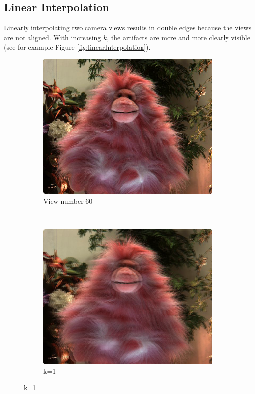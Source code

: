 \documentclass[a4paper]{article}
\begin{document}
\subsection*{Linear Interpolation}
Linearly interpolating two camera views results in double edges because the views are not aligned. With increasing $k$, the artifacts are more and more clearly visible (see for example Figure \ref{fig:linearInterpolation}). 
\begin{figure}[ht]
	\begin{subfigure}[h]{0.48\textwidth}
	  \includegraphics[width=\textwidth]{view60}
	  \caption*{View number 60}
	\end{subfigure}
    	~
	\begin{subfigure}[h]{0.48\textwidth}
	  \centering
	  \includegraphics[width=\textwidth]{LinearInterpolation60_61}
	  \caption*{k=1}
	\end{subfigure}
	

\end{figure}
\end{document}
